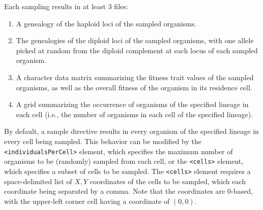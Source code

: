 \documentclass[11pt]{article}
\newcommand{\xmlelem}[1]{{\tt<\textcolor{xmlelem}{#1}>}}
\begin{document}
Each sampling results in at least 3 files: 
\begin{enumerate}
	\item A genealogy of the haploid loci of the sampled organisms.
	\item The genealogies of the diploid loci of the sampled organisms, with one allele picked at random from the diploid complement at each locus of each sampled organism.
	\item A character data matrix summarizing the fitness trait values of the sampled organisms, as well as the overall fitness of the organism in its residence cell.
	\item A grid summarizing the occurrence of organisms of the specified lineage in each cell (i.e., the number of organisms in each cell of the specified lineage). 
\end{enumerate}

By default, a sample directive results in every organism of the specified lineage in every cell being sampled. 
This behavior can be modified by the \xmlelem{individualsPerCell} element, which specifies the maximum number of organisms to be (randomly) sampled from each cell, or the \xmlelem{cells} element, which specifies a subset of cells to be sampled.
The \xmlelem{cells} element requires a space-delimited list of $X,Y$ coordinates of the cells to be sampled, which each coordinate being separated by a comma. Note that the coordinates are 0-based, with the upper-left corner cell having a coordinate of $(0,0)$.
\end{document}

